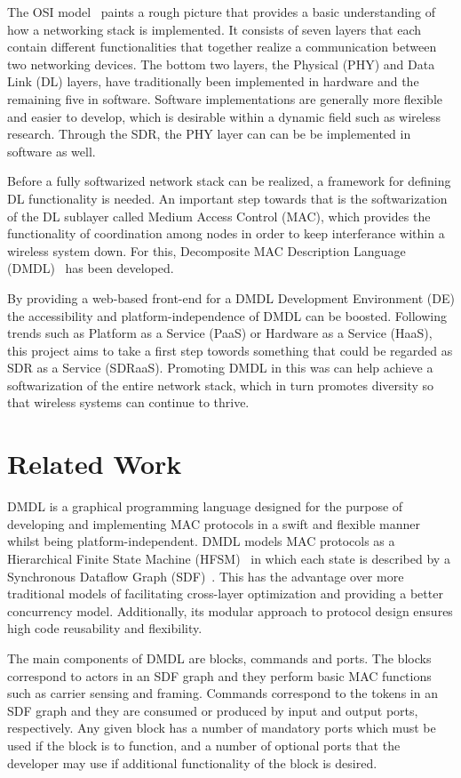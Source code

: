 \documentclass[journal,comsoc]{IEEEtran}
\begin{document}
The OSI model~\cite{osi} paints a rough picture that provides a basic understanding of
how a networking stack is implemented. It consists of seven layers that each contain different
functionalities that together realize a communication between two networking devices. The bottom
two layers, the Physical (PHY) and Data Link (DL) layers, have traditionally been implemented
in hardware and the remaining five in software. Software implementations are generally more
flexible and easier to develop, which is desirable within a dynamic field such as wireless
research. Through the SDR, the PHY layer can can be be implemented in software as well.

Before a fully softwarized network stack can be realized, a framework for defining DL functionality
is needed. An important step towards that is the softwarization of the DL sublayer
called Medium Access Control (MAC), which provides the functionality of coordination among nodes
in order to keep interferance within a wireless system down. For this,
Decomposite MAC Description Language (DMDL)~\cite{dmdl} has been developed.

By providing a web-based front-end for a DMDL Development Environment (DE) the accessibility
and platform-independence of DMDL can be boosted. Following trends such as
Platform as a Service (PaaS) or Hardware as a Service (HaaS), this project aims to take a first
step towords something that could be regarded as SDR as a Service (SDRaaS). Promoting DMDL in
this was can help achieve a softwarization of the entire network stack, which in turn promotes
diversity so that wireless systems can continue to thrive. 


\section{Related Work}
DMDL is a graphical programming language designed for the purpose of developing and implementing
MAC protocols in a swift and flexible manner whilst being platform-independent. DMDL models
MAC protocols as a Hierarchical Finite State Machine (HFSM)~\cite{hfsm} in which each state is
described by a Synchronous Dataflow Graph (SDF)~\cite{sdf}. This has the advantage over more
traditional models of facilitating cross-layer optimization and providing a better concurrency
model. Additionally, its modular approach to protocol design ensures high code reusability and
flexibility.

The main components of DMDL are blocks, commands and ports. The blocks correspond to actors
in an SDF graph and they perform basic MAC functions such as carrier sensing and framing.
Commands correspond to the tokens in an SDF graph and they are consumed or produced by input
and output ports, respectively. Any given block has a number of mandatory ports which must
be used if the block is to function, and a number of optional ports that the developer may
use if additional functionality of the block is desired.
\end{document}
